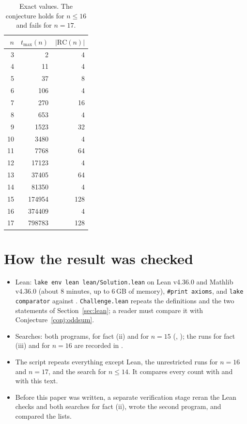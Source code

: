 \documentclass[11pt]{article}
\theoremstyle{remark}
\newcommand{\RC}{\mathrm{RC}}
\newcommand{\tmax}{t_{\max}}
\begin{document}
\begin{table}[t]
\centering
\begin{tabular}{rrr}
\toprule
$n$ & $\tmax(n)$ & $|\RC(n)|$ \\
\midrule
3 & 2 & 4 \\
4 & 11 & 4 \\
5 & 37 & 8 \\
6 & 106 & 4 \\
7 & 270 & 16 \\
8 & 653 & 4 \\
9 & 1523 & 32 \\
10 & 3480 & 4 \\
11 & 7768 & 64 \\
12 & 17123 & 4 \\
13 & 37405 & 64 \\
14 & 81350 & 4 \\
15 & 174954 & 128 \\
16 & 374409 & 4 \\
17 & 798783 & 128 \\
\bottomrule
\end{tabular}
\caption{Exact values. The conjecture holds for $n \le 16$ and fails for $n = 17$.}
\label{tab:small}
\end{table}

\section{How the result was checked}

\begin{itemize}
\item Lean: \texttt{lake env lean lean/Solution.lean} on Lean v4.36.0 and Mathlib v4.36.0 (about 8 minutes, up to 6\,GB of memory), \texttt{\#print axioms}, and \texttt{lake comparator} against . \texttt{Challenge.lean} repeats the definitions and the two statements of Section~\ref{sec:lean}; a reader must compare it with Conjecture~\ref{conj:oddsum}.
\item Searches: both programs, for fact (ii) and for $n = 15$ (, ); the runs for fact (iii) and for $n = 16$ are recorded in .
\item The script  repeats everything except Lean, the unrestricted runs for $n = 16$ and $n = 17$, and the search for $n \le 14$. It compares every count with  and with this text.
\item Before this paper was written, a separate verification stage reran the Lean checks and both searches for fact (ii), wrote the second program, and compared the lists.
\end{itemize}
\end{document}
